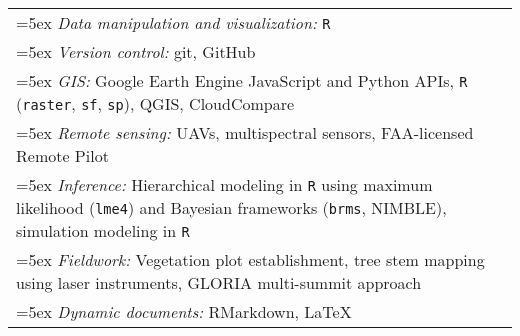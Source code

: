 \begin{longtable}{@{}>{\raggedright}p{5.25in} >{\raggedleft}X@{}}

\hangindent=5ex \emph{Data manipulation and visualization:} \texttt{R} & \tabularnewline
\hangindent=5ex \emph{Version control:} git, GitHub & \tabularnewline
\hangindent=5ex \emph{GIS:} Google Earth Engine JavaScript and Python APIs, \texttt{R} (\texttt{raster}, \texttt{sf}, \texttt{sp}), QGIS, CloudCompare & \tabularnewline
\hangindent=5ex \emph{Remote sensing:} UAVs, multispectral sensors, FAA-licensed Remote Pilot & \tabularnewline
\hangindent=5ex \emph{Inference:} Hierarchical modeling in \texttt{R} using maximum likelihood (\texttt{lme4}) and Bayesian frameworks (\texttt{brms}, NIMBLE), simulation modeling in \texttt{R} & \tabularnewline
\hangindent=5ex \emph{Fieldwork:} Vegetation plot establishment, tree stem mapping using laser instruments, GLORIA multi-summit approach & \tabularnewline
\hangindent=5ex \emph{Dynamic documents:} RMarkdown, \LaTeX{} & \tabularnewline

\end{longtable}